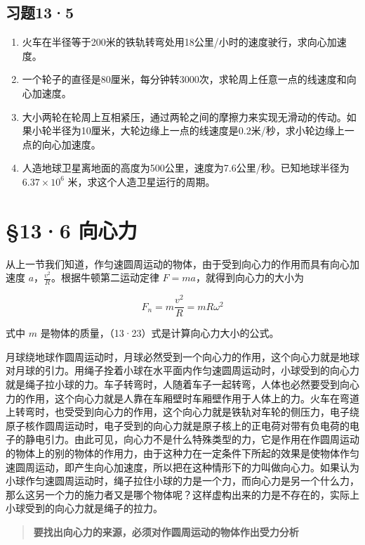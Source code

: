 \subsection{习题13·5}\label{ux4e60ux9898135}

\begin{enumerate}
\def\labelenumi{\arabic{enumi}.}
\item
  火车在半径等于200米的铁轨转弯处用18公里/小时的速度驶行，求向心加速度。
\item
  一个轮子的直径是80厘米，每分钟转3000次，求轮周上任意一点的线速度和向心加速度。
\item
  大小两轮在轮周上互相紧压，通过两轮之间的摩擦力来实现无滑动的传动。如果小轮半径为10厘米，大轮边缘上一点的线速度是0.2米/秒，求小轮边缘上一点的向心加速度。
\item
  人造地球卫星离地面的高度为500公里，速度为7.6公里/秒。已知地球半径为
  \(6.37 \times 10^{6}\) 米，求这个人造卫星运行的周期。
\end{enumerate}

\section{§13·6 向心力}\label{ux5411ux5fc3ux529b}

从上一节我们知道，作匀速圆周运动的物体，由于受到向心力的作用而具有向心加速度
\(a\)，\(\frac{v^2}{R}\)。根据牛顿第二运动定律
\(F = ma\)，就得到向心力的大小为

\[
F_{n}=m\frac{v^{2}}{R}=mR\omega^{2} \tag{13.23}
\]

式中 \(m\) 是物体的质量，（13·23）式是计算向心力大小的公式。

月球绕地球作圆周运动时，月球必然受到一个向心力的作用，这个向心力就是地球对月球的引力。用绳子拴着小球在水平面内作匀速圆周运动时，小球受到的向心力就是绳子拉小球的力。车子转弯时，人随着车子一起转弯，人体也必然要受到向心力的作用，这个向心力就是人靠在车厢壁时车厢壁作用于人体上的力。火车在弯道上转弯时，也受受到向心力的作用，这个向心力就是铁轨对车轮的侧压力，电子绕原子核作圆周运动时，电子受到的向心力就是原子核上的正电荷对带有负电荷的电子的静电引力。由此可见，向心力不是什么特殊类型的力，它是作用在作圆周运动的物体上的别的物体的作用力，由于这种力在一定条件下所起的效果是使物体作匀速圆周运动，即产生向心加速度，所以把在这种情形下的力叫做向心力。如果认为小球作匀速圆周运动时，绳子拉住小球的力是一个力，而向心力是另一个什么力，那么这另一个力的施力者又是哪个物体呢？这样虚构出来的力是不存在的，实际上小球受到的向心力就是绳子的拉力。

\begin{quote}
\textbf{要找出向心力的来源，必须对作圆周运动的物体作出受力分析}
\end{quote}

